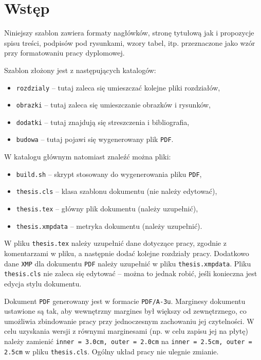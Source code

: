 \chapter{Wstęp}

Niniejszy szablon zawiera formaty nagłówków, stronę tytułową jak i propozycje spisu treści, podpisów pod rysunkami, wzory tabel, itp. przeznaczone jako wzór przy formatowaniu pracy dyplomowej.

Szablon złożony jest z następujących katalogów:
\begin{itemize}
\item \texttt{rozdzialy} -- tutaj zaleca się umieszczać kolejne pliki rozdziałów,
\item \texttt{obrazki}   -- tutaj zaleca się umieszczanie obrazków i rysunków,
\item \texttt{dodatki}   -- tutaj znajdują się streszczenia i bibliografia,
\item \texttt{budowa}    -- tutaj pojawi się wygenerowany plik \texttt{PDF}.
\end{itemize}

W katalogu głównym natomiast znaleźć można pliki:
\begin{itemize}
\item \texttt{build.sh}       -- skrypt stosowany do wygenerowania pliku \texttt{PDF},
\item \texttt{thesis.cls}     -- klasa szablonu dokumentu (nie należy edytować),
\item \texttt{thesis.tex}     -- główny plik dokumentu (należy uzupełnić),
\item \texttt{thesis.xmpdata} -- metryka dokumentu (należy uzupełnić).
\end{itemize}

W pliku \texttt{thesis.tex} należy uzupełnić dane dotyczące pracy, zgodnie z komentarzami w pliku, a następnie dodać kolejne rozdziały pracy. Dodatkowo dane \texttt{XMP} dla dokumentu \texttt{PDF} należy uzupełnić w pliku \texttt{thesis.xmpdata}. Pliku \texttt{thesis.cls} nie zaleca się edytować -- można to jednak robić, jeśli konieczna jest edycja stylu dokumentu.

Dokument \texttt{PDF} generowany jest w formacie \texttt{PDF/A-3u}. Marginesy dokumentu ustawione są tak, aby wewnętrzny margines był większy od zewnętrznego, co umożliwia zbindowanie pracy przy jednoczesnym zachowaniu jej czytelności. W celu uzyskania wersji z równymi marginesami (np. w celu zapisu jej na płytę) należy zamienić \verb|inner = 3.0cm, outer = 2.0cm| na \verb|inner = 2.5cm, outer = 2.5cm| w pliku \texttt{thesis.cls}. Ogólny układ pracy nie ulegnie zmianie.
